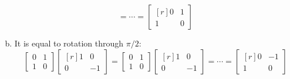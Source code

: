 \documentclass[../main.tex]{subfiles}
\begin{document}
\begin{enumerate}[a)]
\[			=
			\cdots
			=
			\begin{bmatrix*}[r]
				0 & 1 \\
				1 & 0
			\end{bmatrix*}
		\]
	\setcounter{enumi}{5}
	\item It is equal to rotation through $\pi/2$:
		\[
			\begin{bmatrix}0&1\\1&0\end{bmatrix}
			\begin{bmatrix*}[r]1&0\\0&-1\end{bmatrix*}
			=
			\begin{bmatrix}0&1\\1&0\end{bmatrix}
			\begin{bmatrix*}[r]1&0\\0&-1\end{bmatrix*}
			=
			\cdots
			=
			\begin{bmatrix*}[r]
				0 & -1 \\
				1 & 0
			\end{bmatrix*}
		\]
\end{enumerate}
\end{document}

